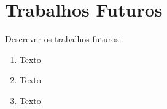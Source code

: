 \chapter{Trabalhos Futuros}
\label{ch:trabalhos_futuros}
	Descrever os trabalhos futuros.

	\begin{enumerate}
		\item Texto
		\item Texto
		\item Texto
	\end{enumerate}
